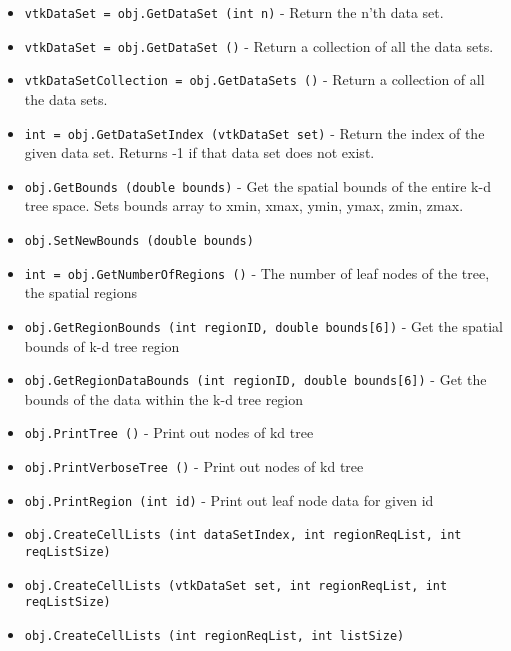 \begin{itemize}
\item  \verb|vtkDataSet = obj.GetDataSet (int n)| -  Return the n'th data set.

\item  \verb|vtkDataSet = obj.GetDataSet ()| -  Return a collection of all the data sets.

\item  \verb|vtkDataSetCollection = obj.GetDataSets ()| -  Return a collection of all the data sets.

\item  \verb|int = obj.GetDataSetIndex (vtkDataSet set)| -  Return the index of the given data set.  Returns -1 if that data
 set does not exist.

\item  \verb|obj.GetBounds (double bounds)| -    Get the spatial bounds of the entire k-d tree space. Sets
    bounds array to xmin, xmax, ymin, ymax, zmin, zmax.

\item  \verb|obj.SetNewBounds (double bounds)|

\item  \verb|int = obj.GetNumberOfRegions ()| -    The number of leaf nodes of the tree, the spatial regions

\item  \verb|obj.GetRegionBounds (int regionID, double bounds[6])| -    Get the spatial bounds of k-d tree region

\item  \verb|obj.GetRegionDataBounds (int regionID, double bounds[6])| -     Get the bounds of the data within the k-d tree region

\item  \verb|obj.PrintTree ()| -     Print out nodes of kd tree

\item  \verb|obj.PrintVerboseTree ()| -     Print out nodes of kd tree

\item  \verb|obj.PrintRegion (int id)| -     Print out leaf node data for given id

\item  \verb|obj.CreateCellLists (int dataSetIndex, int regionReqList, int reqListSize)|

\item  \verb|obj.CreateCellLists (vtkDataSet set, int regionReqList, int reqListSize)|

\item  \verb|obj.CreateCellLists (int regionReqList, int listSize)|


\end{itemize}
